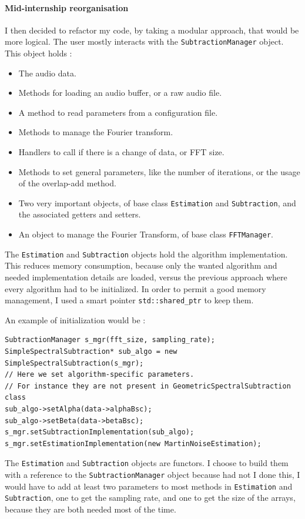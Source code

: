 \paragraph{Mid-internship reorganisation}
I then decided to refactor my code, by taking a modular approach, that would be more logical.
The user mostly interacts with the \texttt{SubtractionManager} object. This object holds : 
\begin{itemize}
\item The audio data.
\item Methods for loading an audio buffer, or a raw audio file.
\item A method to read parameters from a configuration file.
\item Methods to manage the Fourier transform.
\item Handlers to call if there is a change of data, or FFT size.
\item Methods to set general parameters, like the number of iterations, or the usage of the overlap-add method.
\item Two very important objects, of base class \texttt{Estimation} and \texttt{Subtraction}, and the associated getters and setters.
\item An object to manage the Fourier Transform, of base class \texttt{FFTManager}.
\end{itemize}
The \texttt{Estimation} and \texttt{Subtraction} objects hold the algorithm implementation. This reduces memory consumption, because only the wanted algorithm and needed implementation details are loaded, versus the previous approach where every algorithm had to be initialized. In order to permit a good memory management, I used a  smart pointer \texttt{std::shared\_ptr} to keep them.

An example of initialization would be : 
\begin{lstlisting}[caption=Example initialization]
SubtractionManager s_mgr(fft_size, sampling_rate);
SimpleSpectralSubtraction* sub_algo = new SimpleSpectralSubtraction(s_mgr);
// Here we set algorithm-specific parameters.
// For instance they are not present in GeometricSpectralSubtraction class
sub_algo->setAlpha(data->alphaBsc); 
sub_algo->setBeta(data->betaBsc);
s_mgr.setSubtractionImplementation(sub_algo);
s_mgr.setEstimationImplementation(new MartinNoiseEstimation);
\end{lstlisting}

The \texttt{Estimation} and \texttt{Subtraction} objects are functors. I choose to build them with a reference to the \texttt{SubtractionManager} object because had not I done this, I would have to add at least two parameters to most methods in \texttt{Estimation} and \texttt{Subtraction}, one to get the sampling rate, and one to get the size of the arrays, because they are both needed most of the time.


